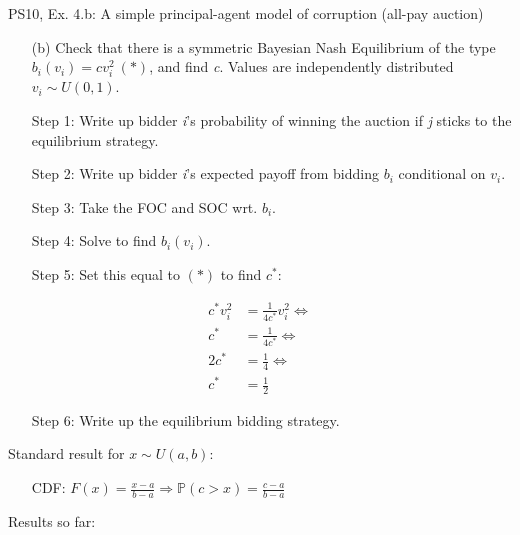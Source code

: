 \begin{frame}{PS10, Ex. 4.b: A simple principal-agent model of corruption (all-pay auction)}
    \begin{itemize}
      \item[(b)] Check that there is a symmetric Bayesian Nash Equilibrium of the type $b_i(v_i) = cv_i^2\ (*)$, and find \textit{c}. Values are independently distributed $v_i\sim U(0, 1)$.
    \end{itemize} \vspace{-8pt}
    \begin{multicols}{2}
      \begin{itemize}
        \item[Step 1:] Write up bidder \textit{i}'s probability of winning the auction if \textit{j} sticks to the equilibrium strategy.
        \item[Step 2:] Write up bidder \textit{i}'s expected payoff from bidding $b_i$ conditional on $v_i$.
        \item[Step 3:] Take the FOC and SOC wrt. $b_i$.
        \item[Step 4:] Solve to find $b_i(v_i)$.
        \item[Step 5:] Set this equal to $(*)$ to find $c^*$:
      \end{itemize} \vspace{-6pt}
      \begin{align*}
        c^*v_i^2&=\frac{1}{4c^*}v_i^2\Leftrightarrow\\
        c^*&=\frac{1}{4c^*}\Leftrightarrow\\
        2c^*&=\frac{1}{4}\Leftrightarrow\\
        c^*&=\frac{1}{2}
      \end{align*} \vspace{-12pt}
      \begin{itemize}
        \item[Step 6:] Write up the equilibrium bidding strategy.
      \end{itemize}
      \vfill\null\columnbreak
      Standard result for $x\sim U(a, b):$ \vspace{-6pt}
      \begin{itemize}
        \item[CDF:] $F(x)=\frac{x-a}{b-a}\Rightarrow\mathbb{P}(c>x)=\frac{c-a}{b-a}$
      \end{itemize}
      \vspace{-6pt}
      Results so far: \vspace{-6pt}
      \begin{align*}

\end{align*}
\end{multicols}
\end{frame}
